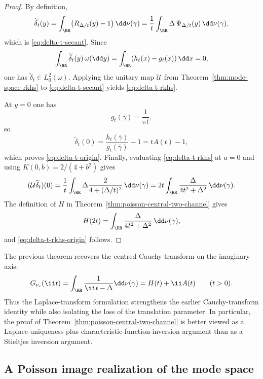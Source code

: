 \begin{proof}
By definition,
\[
\widetilde\delta_t(y)
=\int_{\RR}\bigl(R_{\Delta/t}(y)-1\bigr)\,\dd\nu(\gamma)
=\frac{1}{t}\int_{\RR}\Delta\,\Psi_{\Delta/t}(y)\,\dd\nu(\gamma),
\]
which is \eqref{eq:delta-t-secant}.  Since
\[
\int_{\RR}\widetilde\delta_t(y)\,\omega(\dd y)
=\int_{\RR}(h_t(x)-g_t(x))\,\dd x=0,
\]
one has $\widetilde\delta_t\in L^2_0(\omega)$.  Applying the unitary map
$\mathcal U$ from Theorem~\ref{thm:mode-space-rkhs} to
\eqref{eq:delta-t-secant} yields \eqref{eq:delta-t-rkhs}.

At $y=0$ one has
\[
g_t(\bar\gamma)=\frac{1}{\pi t},
\]
so
\[
\widetilde\delta_t(0)
=\frac{h_t(\bar\gamma)}{g_t(\bar\gamma)}-1
=tA(t)-1,
\]
which proves \eqref{eq:delta-t-origin}.  Finally, evaluating
\eqref{eq:delta-t-rkhs} at $a=0$ and using
$K(0,b)=2/(4+b^2)$ gives
\[
(\mathcal U\widetilde\delta_t)(0)
=\frac{1}{t}\int_{\RR}\Delta\frac{2}{4+(\Delta/t)^2}\,\dd\nu(\gamma)
=2t\int_{\RR}\frac{\Delta}{4t^2+\Delta^2}\,\dd\nu(\gamma).
\]
The definition of $H$ in
Theorem~\ref{thm:poisson-central-two-channel} gives
\[
H(2t)=\int_{\RR}\frac{\Delta}{4t^2+\Delta^2}\,\dd\nu(\gamma),
\]
and \eqref{eq:delta-t-rkhs-origin} follows.
\end{proof}

\begin{remark}
The previous theorem recovers the centred Cauchy transform on the
imaginary axis:
\[
G_{\nu_c}(\ii t)
=\int_{\RR}\frac{1}{\ii t-\Delta}\dd\nu(\gamma)
=H(t)+\ii A(t)
\qquad(t>0).
\]
Thus the Laplace-transform formulation strengthens the earlier
Cauchy-transform identity while also isolating the loss of the translation
parameter.  In particular, the proof of
Theorem~\ref{thm:poisson-central-two-channel} is better viewed as a
Laplace-uniqueness plus characteristic-function-inversion argument than
as a Stieltjes inversion argument.
\end{remark}

\subsection{A Poisson image realization of the mode space}

